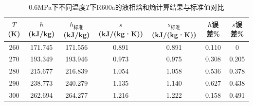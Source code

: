 \documentclass[12pt,a4paper]{article}
\begin{document}
\begin{table}[h]
\centering
\caption{0.6MPa下不同温度$T$下R600a的液相焓和熵计算结果与标准值对比}
\begin{tabular}{c c c c c c c}
\hline
$T$ (K) & $h$ (kJ/kg) &$h_\text{标准}$(kJ/kg) & $s$ (kJ/(kg·K)) &$s_\text{标准}$(kJ/(kg·K))& $h$误差\%&$s$误差\%\\
\hline
260 & 171.745& 171.556& 0.891& 0.891& 0.110& 0\\
270 & 193.349& 193.946& 0.973& 0.975& 0.308& 0.205\\
280 & 215.677& 216.839& 1.054& 1.058& 0.536& 0.378\\
290 & 238.773& 240.279& 1.135& 1.140& 0.627& 0.438\\
300 & 262.694& 264.277& 1.216& 1.222& 0.158& 0.491\\
\hline
\end{tabular}
\end{table}
\end{document}
